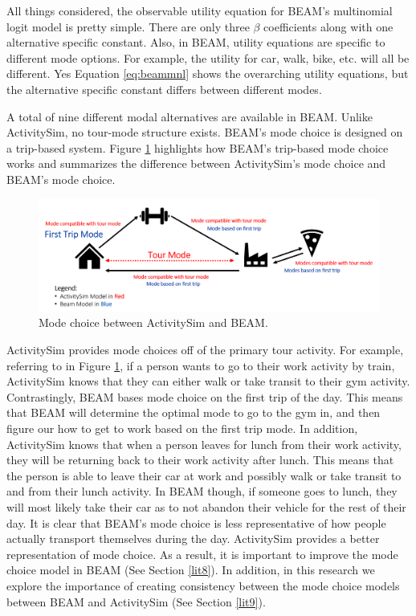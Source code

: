 \documentclass[12pt, oneside, openright]{byuthesis}
\begin{document}
All things considered, the observable utility equation for BEAM's multinomial logit model is pretty simple. There are only three \(\beta\) coefficients along with one alternative specific constant. Also, in BEAM, utility equations are specific to different mode options. For example, the utility for car, walk, bike, etc. will all be different. Yes Equation \eqref{eq:beammnl} shows the overarching utility equations, but the alternative specific constant differs between different modes.

A total of nine different modal alternatives are available in BEAM. Unlike ActivitySim, no tour-mode structure exists. BEAM's mode choice is designed on a trip-based system. Figure \ref{fig:fig-mode-compare} highlights how BEAM's trip-based mode choice works and summarizes the difference between ActivitySim's mode choice and BEAM's mode choice.

\begin{figure}

{\centering \includegraphics[width=1\linewidth]{pics/asim-beam-compare} 

}

\caption{Mode choice between ActivitySim and BEAM.}\label{fig:fig-mode-compare}
\end{figure}

ActivitySim provides mode choices off of the primary tour activity. For example, referring to in Figure \ref{fig:fig-mode-compare}, if a person wants to go to their work activity by train, ActivitySim knows that they can either walk or take transit to their gym activity. Contrastingly, BEAM bases mode choice on the first trip of the day. This means that BEAM will determine the optimal mode to go to the gym in, and then figure our how to get to work based on the first trip mode. In addition, ActivitySim knows that when a person leaves for lunch from their work activity, they will be returning back to their work activity after lunch. This means that the person is able to leave their car at work and possibly walk or take transit to and from their lunch activity. In BEAM though, if someone goes to lunch, they will most likely take their car as to not abandon their vehicle for the rest of their day. It is clear that BEAM's mode choice is less representative of how people actually transport themselves during the day. ActivitySim provides a better representation of mode choice. As a result, it is important to improve the mode choice model in BEAM (See Section \ref{lit8}). In addition, in this research we explore the importance of creating consistency between the mode choice models between BEAM and ActivitySim (See Section \ref{lit9}).
\end{document}
